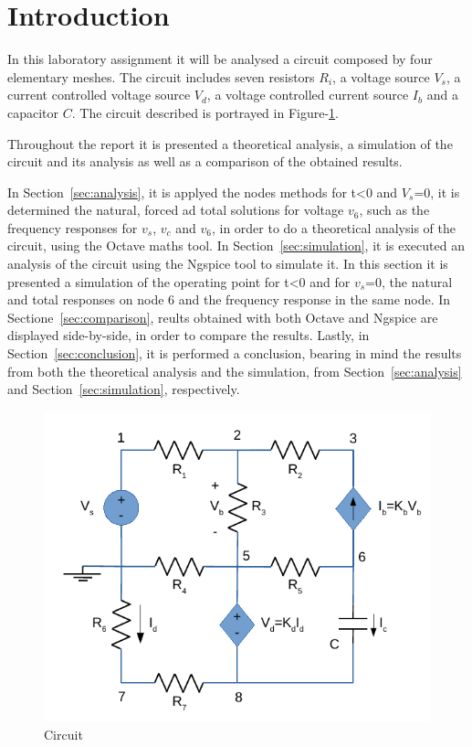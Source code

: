 \section{Introduction}
\label{sec:introduction}

In this laboratory assignment it will be analysed a circuit composed by four
elementary meshes. The circuit includes seven resistors $R_i$, a voltage source
$V_s$, a current controlled voltage source $V_d$, a voltage controlled current
source $I_b$ and a capacitor $C$. The circuit described is portrayed in
Figure-\ref{fig:circuit}.

Throughout the report it is presented a theoretical analysis, a simulation of the
circuit and its analysis as well as a comparison of the obtained results. \par
In Section~\ref{sec:analysis}, it is applyed the nodes methods for t<0 and $V_s$=0,
it is determined the natural, forced ad total solutions for voltage $v_6$, such as
the frequency responses for $v_s$, $v_c$ and $v_6$, in order to do a theoretical
analysis of the circuit, using the Octave maths tool.
In Section~\ref{sec:simulation}, it is executed an analysis of the circuit using
the Ngspice tool to simulate it. In this section it is presented a simulation of
the operating point for t<0 and for $v_s$=0, the natural and total responses on node 6
and the frequency response in the same node.
In Sectione~\ref{sec:comparison}, reults obtained with both Octave and Ngspice are
displayed side-by-side, in order to compare the results.
Lastly, in Section~\ref{sec:conclusion}, it is performed a conclusion, bearing in mind the
results from both the theoretical analysis and the simulation, from Section~\ref{sec:analysis}
and Section~\ref{sec:simulation}, respectively.


\begin{figure}[H] \centering
\includegraphics[width=0.7\linewidth]{circuit.pdf}
\caption{Circuit}
\label{fig:circuit}
\end{figure}

\newpage
